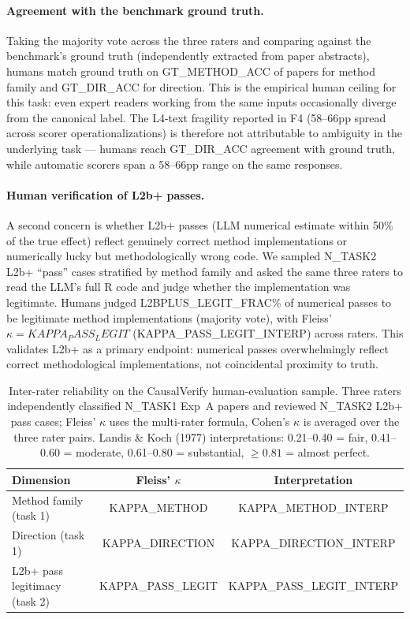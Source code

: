 \paragraph{Agreement with the benchmark ground truth.}
Taking the majority vote across the three raters and comparing against
the benchmark's ground truth (independently extracted from paper
abstracts), humans match ground truth on {{GT_METHOD_ACC}} of papers for
method family and {{GT_DIR_ACC}} for direction. This is the empirical
human ceiling for this task: even expert readers working from the same
inputs occasionally diverge from the canonical label. The L4-text
fragility reported in F4 (58--66pp spread across scorer
operationalizations) is therefore not attributable to ambiguity in the
underlying task --- humans reach {{GT_DIR_ACC}} agreement with ground
truth, while automatic scorers span a 58--66pp range on the same
responses.

\paragraph{Human verification of L2b+ passes.}
A second concern is whether L2b+ passes (LLM numerical estimate within
50\% of the true effect) reflect genuinely correct method implementations
or numerically lucky but methodologically wrong code. We sampled
{{N_TASK2}} L2b+ ``pass'' cases stratified by method family and asked the
same three raters to read the LLM's full R code and judge whether the
implementation was legitimate. Humans judged {{L2BPLUS_LEGIT_FRAC}}\% of
numerical passes to be legitimate method implementations (majority
vote), with Fleiss' $\kappa = {{KAPPA_PASS_LEGIT}}$
({{KAPPA_PASS_LEGIT_INTERP}}) across raters. This validates L2b+ as a
primary endpoint: numerical passes overwhelmingly reflect correct
methodological implementations, not coincidental proximity to truth.

\begin{table}[h]
\centering
\caption{Inter-rater reliability on the CausalVerify human-evaluation
sample. Three raters independently classified {{N_TASK1}} Exp~A papers
and reviewed {{N_TASK2}} L2b+ pass cases; Fleiss' $\kappa$ uses the
multi-rater formula, Cohen's $\kappa$ is averaged over the three rater
pairs. Landis \& Koch (1977) interpretations: 0.21--0.40 = fair,
0.41--0.60 = moderate, 0.61--0.80 = substantial,
$\geq 0.81$ = almost perfect.}
\label{tab:irr}
\small
\begin{tabular}{lcc}
\toprule
\textbf{Dimension} & \textbf{Fleiss' $\kappa$} & \textbf{Interpretation} \\
\midrule
Method family (task 1)        & {{KAPPA_METHOD}}      & {{KAPPA_METHOD_INTERP}} \\
Direction (task 1)            & {{KAPPA_DIRECTION}}   & {{KAPPA_DIRECTION_INTERP}} \\
L2b+ pass legitimacy (task 2) & {{KAPPA_PASS_LEGIT}}  & {{KAPPA_PASS_LEGIT_INTERP}} \\
\bottomrule
\end{tabular}
\end{table}
